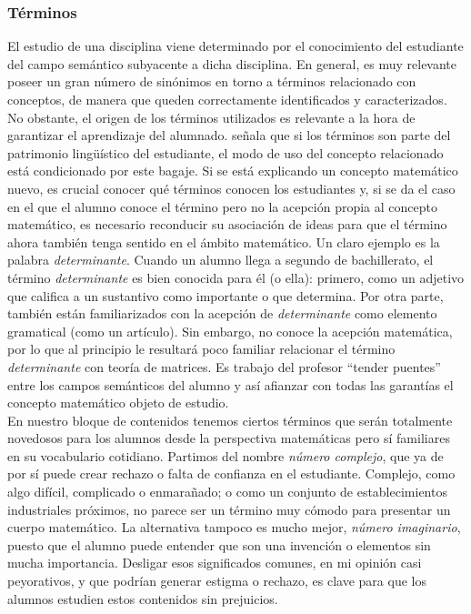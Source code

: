 \documentclass[../main.tex]{memoir}
\begin{document}
\subsubsection{Términos}

El estudio de una disciplina viene determinado por el conocimiento del estudiante del campo semántico subyacente a dicha disciplina. En general, es muy relevante poseer un gran número de sinónimos en torno a términos relacionado con conceptos, de manera que queden correctamente identificados y caracterizados. No obstante, el origen de los términos utilizados es relevante a la hora de garantizar el aprendizaje del alumnado. \cite{rico2016} señala que si los términos son parte del patrimonio lingüístico del estudiante, el modo de uso del concepto relacionado está condicionado por este bagaje. Si se está explicando un concepto matemático nuevo, es crucial conocer qué términos conocen los estudiantes y, si se da el caso en el que el alumno conoce el término pero no la acepción propia al concepto matemático, es necesario reconducir su asociación de ideas para que el término ahora también tenga sentido en el ámbito matemático. Un claro ejemplo es la palabra \textit{determinante}. Cuando un alumno llega a segundo de bachillerato, el término \textit{determinante} es bien conocida para él (o ella): primero, como un adjetivo que califica a un sustantivo como importante o que determina. Por otra parte, también están familiarizados con la acepción de \textit{determinante} como elemento gramatical (como un artículo). Sin embargo, no conoce la acepción matemática, por lo que al principio le resultará poco familiar relacionar el término \textit{determinante} con teoría de matrices. Es trabajo del profesor ``tender puentes'' entre los campos semánticos del alumno y así afianzar con todas las garantías el concepto matemático objeto de estudio. \\

En nuestro bloque de contenidos tenemos ciertos términos que serán totalmente novedosos para los alumnos desde la perspectiva matemáticas pero sí familiares en su vocabulario cotidiano. Partimos del nombre \textit{número complejo}, que ya de por sí puede crear rechazo o falta de confianza en el estudiante. Complejo, como algo difícil, complicado o enmarañado; o como un conjunto de establecimientos industriales próximos, no parece ser un término muy cómodo para presentar un cuerpo matemático. La alternativa tampoco es mucho mejor, \textit{número imaginario}, puesto que el alumno puede entender que son una invención o elementos sin mucha importancia. Desligar esos significados comunes, en mi opinión casi peyorativos, y que podrían generar estigma o rechazo, es clave para que los alumnos estudien estos contenidos sin prejuicios. \\
\end{document}
